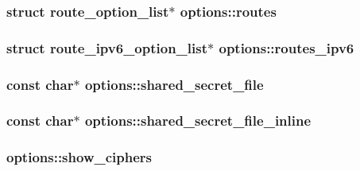 \subsubsection[{routes}]{\setlength{\rightskip}{0pt plus 5cm}struct {\bf route\+\_\+option\+\_\+list}$\ast$ options\+::routes}\label{structoptions_a599b21d6f45322992703af0b4e12741e}
\hypertarget{structoptions_ad3572f352bd2aa332207cddfdc607ff4}{}
\subsubsection[{routes\+\_\+ipv6}]{\setlength{\rightskip}{0pt plus 5cm}struct {\bf route\+\_\+ipv6\+\_\+option\+\_\+list}$\ast$ options\+::routes\+\_\+ipv6}\label{structoptions_ad3572f352bd2aa332207cddfdc607ff4}
\hypertarget{structoptions_af4f6ab25d97dd623648d3c2342659e0d}{}
\subsubsection[{shared\+\_\+secret\+\_\+file}]{\setlength{\rightskip}{0pt plus 5cm}const char$\ast$ options\+::shared\+\_\+secret\+\_\+file}\label{structoptions_af4f6ab25d97dd623648d3c2342659e0d}
\hypertarget{structoptions_aaadf5244b70d58c2cc46417c017ced15}{}
\subsubsection[{shared\+\_\+secret\+\_\+file\+\_\+inline}]{\setlength{\rightskip}{0pt plus 5cm}const char$\ast$ options\+::shared\+\_\+secret\+\_\+file\+\_\+inline}\label{structoptions_aaadf5244b70d58c2cc46417c017ced15}
\hypertarget{structoptions_a98fc9a0879158d9aaf12696ff8726b35}{}
\subsubsection[{show\+\_\+ciphers}]{ options\+::show\+\_\+ciphers}\label{structoptions_a98fc9a0879158d9aaf12696ff8726b35}
\hypertarget{structoptions_a916e724576aa058a30902dc1c34862e8}{}
